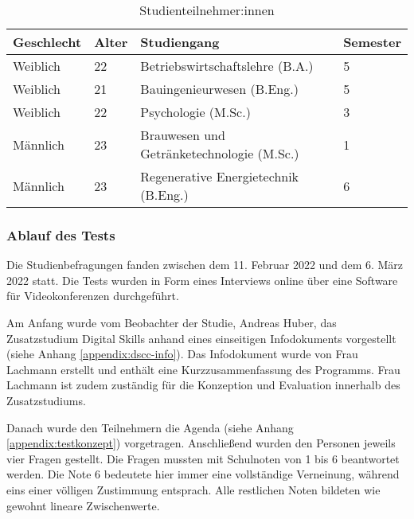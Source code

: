 \begin{table}[H]
\renewcommand*{\arraystretch}{1.6}
\centering
\begin{tabular}{|l|l|l|l|}
\hline
\textbf{Geschlecht} & \textbf{Alter} & \textbf{Studiengang}                      & \textbf{Semester} \\ \hline
Weiblich            & 22             & Betriebswirtschaftslehre (B.A.)           & 5                 \\ \hline
Weiblich            & 21             & Bauingenieurwesen (B.Eng.)                & 5                 \\ \hline
Weiblich            & 22             & Psychologie (M.Sc.)                       & 3                 \\ \hline
Männlich            & 23             & Brauwesen und Getränketechnologie (M.Sc.) & 1                 \\ \hline
Männlich            & 23             & Regenerative Energietechnik (B.Eng.)     & 6                 \\ \hline
\end{tabular}
\caption{Studienteilnehmer:innen}

\label{table:studie-teilnehmende}
\end{table}

\subsubsection{Ablauf des Tests}
Die Studienbefragungen fanden zwischen dem 11. Februar 2022 und dem 6. März 2022
statt. Die Tests wurden in Form eines Interviews online über eine Software für
Videokonferenzen durchgeführt.

Am Anfang wurde vom Beobachter der Studie, Andreas Huber, das Zusatzstudium
Digital Skills anhand eines einseitigen Infodokuments vorgestellt (siehe Anhang
\ref{appendix:dscc-info}). Das Infodokument wurde von Frau Lachmann erstellt und
enthält eine Kurzzusammenfassung des Programms. Frau Lachmann ist zudem 
zuständig für die Konzeption und Evaluation innerhalb des Zusatzstudiums.

Danach wurde den Teilnehmern die Agenda (siehe Anhang
\ref{appendix:testkonzept}) vorgetragen. Anschließend wurden den Personen
jeweils vier Fragen gestellt. Die Fragen mussten mit Schulnoten von 1 bis 6
beantwortet werden. Die Note 6 bedeutete hier immer eine vollständige
Verneinung, während eins einer völligen Zustimmung entsprach. Alle restlichen
Noten bildeten wie gewohnt lineare Zwischenwerte.


